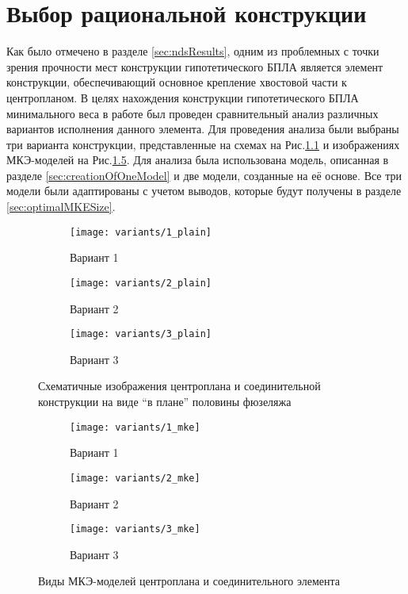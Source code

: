  
\chapter{Выбор рациональной конструкции}
Как было отмечено в разделе \ref{sec:ndsResults}, одним из проблемных с точки зрения прочности мест конструкции гипотетического БПЛА является элемент конструкции, обеспечивающий основное крепление хвостовой части к центропланом. В целях нахождения конструкции гипотетического БПЛА минимального веса в работе был проведен сравнительный анализ различных вариантов исполнения данного элемента. Для проведения анализа были выбраны три варианта конструкции, представленные на схемах на Рис.\ref{fig:variants_plain} и изображениях МКЭ-моделей на Рис.\ref{fig:variants_mke}. Для анализа была использована модель, описанная в разделе \ref{sec:creationOfOneModel} и две модели, созданные на её основе. Все три модели были адаптированы с учетом выводов, которые будут получены в разделе \ref{sec:optimalMKESize}.  

\begin{figure}[H]
\centering
\captionsetup{justification=centering}
\begin{subfigure}[b]{0.32\textwidth}
\centering
	\texttt{[image: variants/1\_plain]}
	\caption{Вариант 1}
\end{subfigure}
\hspace{\fill}
\begin{subfigure}[b]{0.32\textwidth}
\centering
	\texttt{[image: variants/2\_plain]}
	\caption{Вариант 2}
\end{subfigure}
\hspace{\fill}
\begin{subfigure}[b]{0.32\textwidth}
\centering
	\texttt{[image: variants/3\_plain]}
	\caption{Вариант 3}
\end{subfigure}
\hspace{\fill}
\caption{Схематичные изображения центроплана и соединительной конструкции на виде ``в плане'' половины фюзеляжа }
\label{fig:variants_plain}
\end{figure}	


\begin{figure}[H]
\centering
\begin{subfigure}[b]{0.32\textwidth}
	\texttt{[image: variants/1\_mke]}		\caption{Вариант 1}
	\label{fig:variants_mke:1}
\end{subfigure}
\hspace{\fill}
\begin{subfigure}[b]{0.32\textwidth}
	\texttt{[image: variants/2\_mke]}
		\caption{Вариант 2}
		\label{fig:variants_mke:2}
\end{subfigure}
\hspace{\fill}
\begin{subfigure}[b]{0.32\textwidth}
	\texttt{[image: variants/3\_mke]}
		\caption{Вариант 3}
		\label{fig:variants_mke:3}
\end{subfigure}
\hspace{\fill}
\caption{Виды МКЭ-моделей центроплана и соединительного элемента}
\label{fig:variants_mke}
\end{figure}	



